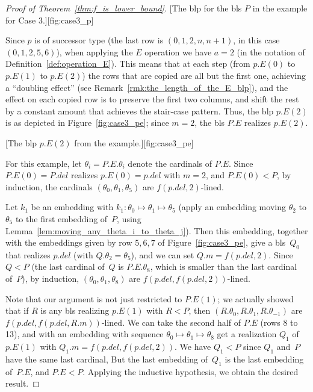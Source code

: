 \documentclass{article}
\theoremstyle{definition}
\theoremstyle{remark}
\begin{document}
\begin{proof}[Proof of Theorem~\ref{thm:f_is_lower_bound}]

    [The blp for the bls $P$ in the example for Case 3.][fig:case3_p]

    Since $p$ is of successor type (the last row is $(0,1,2,n,n+1)$, in this case $(0,1,2,5,6)$), when applying the $E$ operation we have $a=2$ (in the notation of Definition~\ref{def:operation_E}). This means that at each step (from $p.E(0)$ to $p.E(1)$ to $p.E(2)$) the rows that are copied are all but the first one, achieving a ``doubling effect'' (see Remark~\ref{rmk:the_length_of_the_E_blp}), and the effect on each copied row is to preserve the first two columns, and shift the rest by a constant amount that achieves the stair-case pattern. Thus, the blp $p.E(2)$ is as depicted in Figure~\ref{fig:case3_pe}; since $m=2$, the bls $P.E$ realizes $p.E(2)$. 

    [The blp $p.E(2)$ from the example.][fig:case3_pe]

    For this example, let $\theta_i = P.E.\theta_i$ denote the cardinals of $P.E$. Since $P.E(0) = P.del$ realizes $p.E(0)= p.del$ with $m=2$, and $P.E(0)<P$, by induction, the cardinals $(\theta_0,\theta_1,\theta_5)$ are $f(p.del,2)$-lined. 

    Let $k_1$ be an embedding with $k_1: \theta_0\mapsto \theta_1 \mapsto \theta_5$ (apply an embedding moving $\theta_2$ to $\theta_5$ to the first embedding of~$P$, using Lemma~\ref{lem:moving_any_theta_i_to_theta_j}). Then this embedding, together with the embeddings given by row $5,6,7$ of Figure~\ref{fig:case3_pe}, give a bls~$Q_0$ that realizes $p.del$ (with $Q.\theta_2 = \theta_5$), and we can set $Q.m = f(p.del,2)$. Since $Q<P$ (the last cardinal of~$Q$ is $P.E.\theta_8$, which is smaller than the last cardinal of~$P$), by induction, $(\theta_0,\theta_1,\theta_8)$ are $f(p.del,f(p.del,2))$-lined. 

    Note that our argument is not just restricted to $P.E(1)$; we actually showed that if $R$ is any bls realizing $p.E(1)$ with $R<P$, then $(R.\theta_0,R.\theta_1,R.\theta_{-1})$ are $f(p.del,f(p.del,R.m))$-lined. We can take the second half of $P.E$ (rows 8 to 13), and with an embedding with sequence $\theta_0\mapsto \theta_1\mapsto \theta_8$ get a realization $Q_1$ of $p.E(1)$ with $Q_1.m = f(p.del,f(p.del,2))$. We have $Q_1<P$ since $Q_1$ and~$P$ have the same last cardinal, But the last embedding of~$Q_1$ is the last embedding of~$P.E$, and $P.E<P$. Applying the inductive hypothesis, we obtain the desired result. 


\end{proof}
\end{document}

